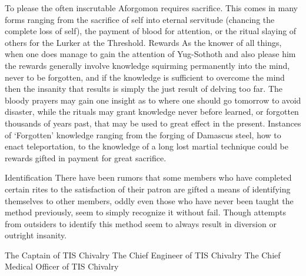 \documentclass[blue]{guildcamp4}
\begin{document}
To please the often inscrutable Aforgomon requires sacrifice. This comes in many forms ranging from the sacrifice of self into eternal servitude (chancing the complete loss of self), the payment of blood for attention, or the ritual slaying of others for the Lurker at the Threshold. 
Rewards
As the knower of all things, when one does manage to gain the attention of Yug-Sothoth and also please him the rewards generally involve knowledge squirming permanently into the mind, never to be forgotten, and if the knowledge is sufficient to overcome the mind then the insanity that results is simply the just result of delving too far.  The bloody prayers may gain one insight as to where one should go tomorrow to avoid disaster, while the rituals may grant knowledge never before learned, or forgotten thousands of years past, that may be used to great effect in the present.  Instances of ‘Forgotten’ knowledge ranging from the forging of Damascus steel, how to enact teleportation, to the knowledge of a long lost martial technique could be rewards gifted in payment for great sacrifice.

Identification
There have been rumors that some members who have completed certain rites to the satisfaction of their patron are gifted a means of identifying themselves to other members, oddly even those who have never been taught the method previously, seem to simply recognize it without fail. Though attempts from outsiders to identify this method seem to always result in diversion or outright insanity.  










\begin{members}
	\member{\cVone{}} The Captain of TIS Chivalry
	\member{\cVtwo{}} The Chief Engineer of TIS Chivalry
	\member{\cVthree{}} The Chief Medical Officer of TIS Chivalry

\end{members}
\end{document}
